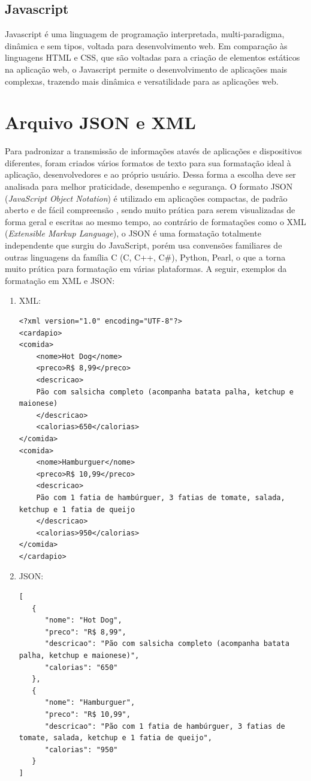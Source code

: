 \documentclass[../../layout.tex]{subfiles}
\begin{document}
\subsection{Javascript}
\hspace*{3em}Javascript é uma linguagem de programação interpretada, multi-paradigma, dinâmica e sem tipos, voltada para desenvolvimento web. Em comparação às linguagens HTML e CSS, que são voltadas para a criação de elementos estáticos na aplicação web, o Javascript permite o desenvolvimento de aplicações mais complexas, trazendo mais dinâmica e versatilidade para as aplicações web.\cite{frontend}

\section{Arquivo JSON e XML}
\hspace*{3em}Para padronizar a transmissão de informações atavés de aplicações e dispositivos diferentes, foram criados vários formatos de texto para sua formatação ideal à aplicação, desenvolvedores e ao próprio usuário. Dessa forma a escolha deve ser analisada para melhor praticidade, desempenho e segurança. O formato JSON (\textit{JavaScript Object Notation}) é utilizado em aplicações compactas, de padrão aberto e de fácil compreensão , sendo muito prática para serem visualizadas de forma geral e escritas ao mesmo tempo, ao contrário de formatações como o XML (\textit{Extensible Markup Language}), o JSON é uma formatação totalmente independente que surgiu do JavaScript, porém usa convensões familiares de outras linguagens da família C (C, C++, C#), Python, Pearl, o que a torna muito prática para formatação em várias plataformas. A seguir, exemplos da formatação em XML e JSON:

\begin{enumerate}[label=\alph*)]
\itemsep0em
  \item XML:
    \begin{verbatim}
<?xml version="1.0" encoding="UTF-8"?>
<cardapio>
<comida>
    <nome>Hot Dog</nome>
    <preco>R$ 8,99</preco>
    <descricao>
   	Pão com salsicha completo (acompanha batata palha, ketchup e maionese)
   	</descricao>
    <calorias>650</calorias>
</comida>
<comida>
    <nome>Hamburguer</nome>
    <preco>R$ 10,99</preco>
    <descricao>
    Pão com 1 fatia de hambúrguer, 3 fatias de tomate, salada, ketchup e 1 fatia de queijo
    </descricao>
    <calorias>950</calorias>
</comida>
</cardapio>
    \end{verbatim}
  
  \item JSON:
    \begin{verbatim}
[
   {
      "nome": "Hot Dog",
      "preco": "R$ 8,99",
      "descricao": "Pão com salsicha completo (acompanha batata palha, ketchup e maionese)",
      "calorias": "650"
   },
   {
      "nome": "Hamburguer",
      "preco": "R$ 10,99",
      "descricao": "Pão com 1 fatia de hambúrguer, 3 fatias de tomate, salada, ketchup e 1 fatia de queijo",
      "calorias": "950"
   }
]
    \end{verbatim}
\end{enumerate}
\end{document}
